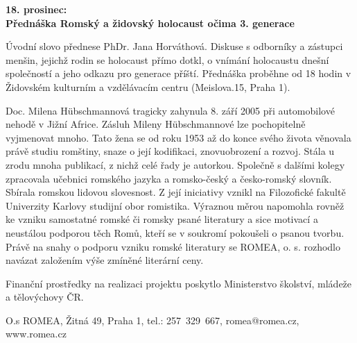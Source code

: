 \noindent
\textbf{18. prosinec: \\ Přednáška Romský a židovský holocaust očima 3. generace}

\noindent
Úvodní slovo přednese PhDr. Jana Horváthová. Diskuse s odborníky a zástupci menšin, jejichž rodin se holocaust přímo dotkl, o vnímání holocaustu dnešní společností a jeho odkazu pro generace příští. Přednáška proběhne od 18 hodin v Židovském kulturním a vzdělávacím centru (Meislova.15, Praha 1).

\bigskip
 
\noindent
Doc. Milena Hübschmannová tragicky zahynula 8. září 2005 při automobilové nehodě v Jižní Africe. Zásluh Mileny Hübschmannové lze pochopitelně vyjmenovat mnoho. Tato žena se od roku 1953 až do konce svého života věnovala právě studiu romštiny, snaze o její kodifikaci, znovuobrození a rozvoj. Stála u zrodu mnoha publikací, z nichž celé řady je autorkou. Společně s dalšími kolegy zpracovala učebnici romského jazyka a romsko-český a česko-romský slovník. Sbírala romskou lidovou slovesnost. Z její iniciativy vznikl na Filozofické fakultě Univerzity Karlovy studijní obor romistika. Výraznou měrou napomohla rovněž ke vzniku samostatné romské či romsky psané literatury a sice motivací a neustálou podporou těch Romů, kteří se v soukromí pokoušeli o psanou tvorbu. Právě na snahy o podporu vzniku romské literatury se ROMEA, o. s. rozhodlo navázat založením výše zmíněné literární ceny.

\bigskip
 
\noindent
Finanční prostředky na realizaci projektu poskytlo Ministerstvo školství, mládeže a tělovýchovy ČR.

\bigskip
 
\noindent
O.s ROMEA, Žitná 49, Praha 1, tel.: 257 329 667, romea@romea.cz, www.romea.cz

